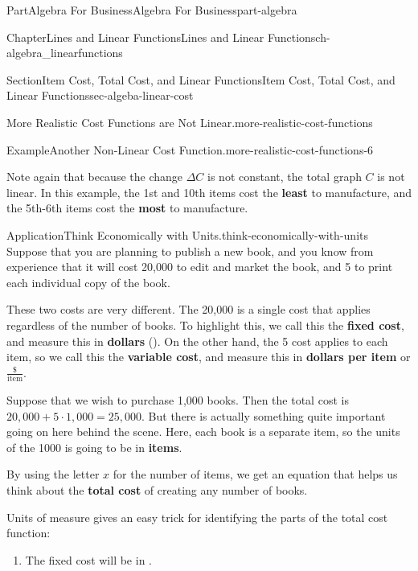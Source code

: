 \documentclass{tufte-book}
\newcommand{\terminology}[1]{\textbf{#1}}
\numberwithin{equation}{chapter}
\def \tikzhistogram (#1,#2){\draw[fill=blue,opacity=0.3] ({#1+((\xtwo-\xmin)/5)},#2) rectangle ({#1-((\xtwo-\xmin)/5)},0); \draw[draw,thick] ({#1+((\xtwo-\xmin)/5)},#2) rectangle ({#1-((\xtwo-\xmin)/5)},0); \node[draw,fill=blue, circle,inner sep=2.5pt] at (#1,#2) {};}
\begin{document}
\begin{partptx}{Part}{Algebra For Business}{}{Algebra For Business}{}{}{part-algebra}
\begin{chapterptx}{Chapter}{Lines and Linear Functions}{}{Lines and Linear Functions}{}{}{ch-algebra_linearfunctions}
\begin{sectionptx}{Section}{Item Cost, Total Cost, and Linear Functions}{}{Item Cost, Total Cost, and Linear Functions}{}{}{sec-algeba-linear-cost}
\begin{paragraphs}{More Realistic Cost Functions are Not Linear.}{more-realistic-cost-functions}
\begin{example}{Example}{Another Non-Linear Cost Function.}{more-realistic-cost-functions-6}
\begin{image}{0.125}{0.75}{0.125}{}
{
}%
\end{image}%
Note again that because the change \(\Delta C\) is not constant, the total graph \(C\) is not linear. In this example, the 1st and 10th items cost the \terminology{least} to manufacture, and the 5th-6th items cost the \terminology{most} to manufacture.%
\end{example}
\end{paragraphs}%
\begin{insight}{Application}{Think Economically with Units.}{think-economically-with-units}%
Suppose that you are planning to publish a new book, and you know from experience that it will cost \textdollar{}20,000 to edit and market the book, and \textdollar{}5 to print each individual copy of the book.%
\par
These two costs are very different. The \textdollar{}20,000 is a single cost that applies regardless of the number of books. To highlight this, we call this the \terminology{fixed cost}, and measure this in \terminology{dollars} (\textdollar{}). On the other hand, the \textdollar{}5 cost applies to each item, so we call this the \terminology{variable cost}, and measure this in \terminology{dollars per item} or \(\frac{\$}{\text{item}}\).%
\par
Suppose that we wish to purchase 1,000 books. Then the total cost is \(20,000 + 5\cdot 1,000 = 25,000\). But there is actually something quite important going on here behind the scene. Here, each book is a separate item, so the units of the 1000 is going to be in \terminology{items}.%
\par
By using the letter \(x\) for the number of items, we get an equation that helps us think about the \terminology{total cost} of creating any number of books.%
\par
Units of measure gives an easy trick for identifying the parts of the total cost function:%
\par
%
\begin{enumerate}
\item{}The fixed cost will be in \textdollar{}.%

\end{enumerate}
\end{insight}
\end{sectionptx}
\end{chapterptx}
\end{partptx}
\end{document}
